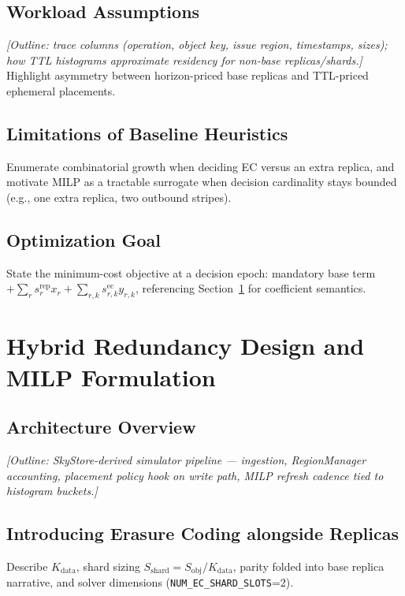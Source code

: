 \documentclass[conference]{IEEEtran}
\begin{document}
\subsection{Workload Assumptions}
\textit{[Outline: trace columns (operation, object key, issue region, timestamps, sizes); how TTL histograms approximate residency for non-base replicas/shards.]}
Highlight asymmetry between horizon-priced base replicas and TTL-priced ephemeral placements.

\subsection{Limitations of Baseline Heuristics}
Enumerate combinatorial growth when deciding EC versus an extra replica, and motivate MILP as a tractable surrogate when decision cardinality stays bounded (e.g., one extra replica, two outbound stripes).

\subsection{Optimization Goal}
State the minimum-cost objective at a decision epoch: mandatory base term \(+\sum_r s^{\mathrm{rep}}_r x_r + \sum_{r,k} s^{\mathrm{ec}}_{r,k} y_{r,k}\), referencing Section~\ref{sec:design} for coefficient semantics.

\section{Hybrid Redundancy Design and MILP Formulation}
\label{sec:design}

\subsection{Architecture Overview}
\textit{[Outline: SkyStore-derived simulator pipeline --- ingestion, RegionManager accounting, placement policy hook on write path, MILP refresh cadence tied to histogram buckets.]}

\subsection{Introducing Erasure Coding alongside Replicas}
Describe \(K_{\mathrm{data}}\), shard sizing \(S_{\mathrm{shard}} = S_{\mathrm{obj}}/K_{\mathrm{data}}\), parity folded into base replica narrative, and solver dimensions (\texttt{NUM\_EC\_SHARD\_SLOTS}=2).
\end{document}
